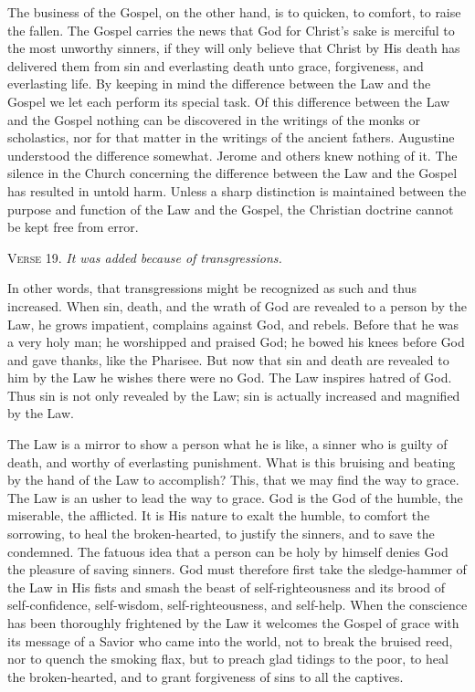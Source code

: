 The business of the Gospel, on the other hand, is to quicken, to comfort, to raise the fallen. The Gospel carries the news that God for Christ’s sake is merciful to the most unworthy sinners, if they will only believe that Christ by His death has delivered them from sin and everlasting death unto grace, forgiveness, and everlasting life. By keeping in mind the difference between the Law and the Gospel we let each perform its special task. Of this difference between the Law and the Gospel nothing can be discovered in the writings of the monks or scholastics, nor for that matter in the writings of the ancient fathers. Augustine understood the difference somewhat. Jerome and others knew nothing of it. The silence in the Church concerning the difference between the Law and the Gospel has resulted in untold harm. Unless a sharp distinction is maintained between the purpose and function of the Law and the Gospel, the Christian doctrine cannot be kept free from error.

\textsc{Verse} 19. \emph{It was added because of transgressions.}

In other words, that transgressions might be recognized as such and thus increased. When sin, death, and the wrath of God are revealed to a person by the Law, he grows impatient, complains against God, and rebels. Before that he was a very holy man; he worshipped and praised God; he bowed his knees before God and gave thanks, like the Pharisee. But now that sin and death are revealed to him by the Law he wishes there were no God. The Law inspires hatred of God. Thus sin is not only revealed by the Law; sin is actually increased and magnified by the Law.

The Law is a mirror to show a person what he is like, a sinner who is guilty of death, and worthy of everlasting punishment. What is this bruising and beating by the hand of the Law to accomplish? This, that we may find the way to grace. The Law is an usher to lead the way to grace. God is the God of the humble, the miserable, the afflicted. It is His nature to exalt the humble, to comfort the sorrowing, to heal the broken-hearted, to justify the sinners, and to save the condemned. The fatuous idea that a person can be holy by himself denies God the pleasure of saving sinners. God must therefore first take the sledge-hammer of the Law in His fists and smash the beast of self-righteousness and its brood of self-confidence, self-wisdom, self-righteousness, and self-help. When the conscience has been thoroughly frightened by the Law it welcomes the Gospel of grace with its message of a Savior who came into the world, not to break the bruised reed, nor to quench the smoking flax, but to preach glad tidings to the poor, to heal the broken-hearted, and to grant forgiveness of sins to all the captives.

